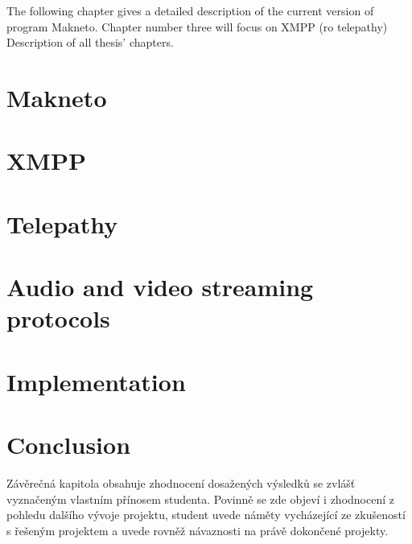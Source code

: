 The following chapter gives a detailed description of the current version of program Makneto. Chapter number three will focus on XMPP (ro telepathy)
Description of all thesis' chapters.



\chapter{Makneto}

\chapter{XMPP}

\chapter{Telepathy}

\chapter{Audio and video streaming protocols}

\chapter{Implementation}

\chapter{Conclusion}
Závěrečná kapitola obsahuje zhodnocení dosažených výsledků se zvlášť vyznačeným vlastním přínosem studenta. Povinně se zde objeví i zhodnocení z pohledu dalšího vývoje projektu, student uvede náměty vycházející ze zkušeností s řešeným projektem a uvede rovněž návaznosti na právě dokončené projekty.

